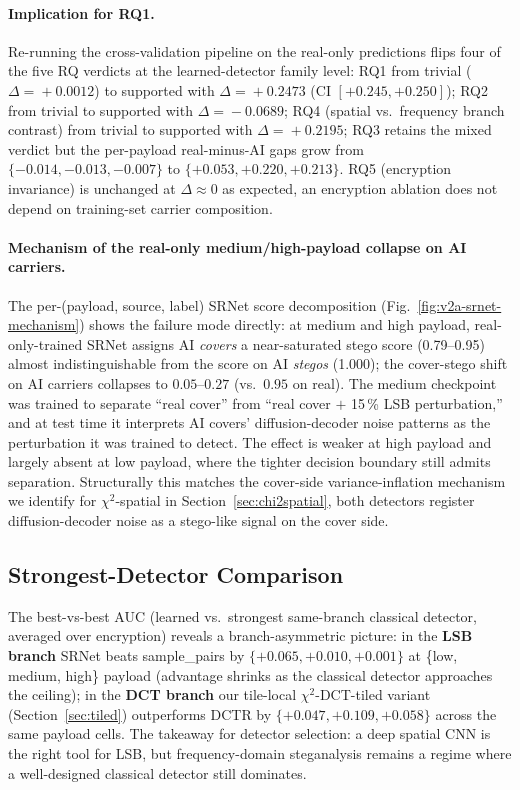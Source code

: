 \documentclass[10pt,twocolumn,a4paper]{article}
\begin{document}
\paragraph{Implication for RQ1.} Re-running the cross-validation pipeline on the real-only predictions flips four of the five RQ verdicts at the learned-detector family level: RQ1 from trivial ($\Delta\!=\!+0.0012$) to supported with $\Delta\!=\!+0.2473$ (CI $[+0.245,+0.250]$); RQ2 from trivial to supported with $\Delta\!=\!-0.0689$; RQ4 (spatial vs.\ frequency branch contrast) from trivial to supported with $\Delta\!=\!+0.2195$; RQ3 retains the mixed verdict but the per-payload real-minus-AI gaps grow from $\{-0.014, -0.013, -0.007\}$ to $\{+0.053, +0.220, +0.213\}$. RQ5 (encryption invariance) is unchanged at $\Delta\!\approx\!0$ as expected, an encryption ablation does not depend on training-set carrier composition.

\paragraph{Mechanism of the real-only medium/high-payload collapse on AI carriers.} The per-(payload, source, label) SRNet score decomposition (Fig.~\ref{fig:v2a-srnet-mechanism}) shows the failure mode directly: at medium and high payload, real-only-trained SRNet assigns AI \emph{covers} a near-saturated stego score (0.79--0.95) almost indistinguishable from the score on AI \emph{stegos} (1.000); the cover-stego shift on AI carriers collapses to $0.05$--$0.27$ (vs.\ $0.95$ on real). The medium checkpoint was trained to separate ``real cover'' from ``real cover $+$ 15\,\% LSB perturbation,'' and at test time it interprets AI covers' diffusion-decoder noise patterns as the perturbation it was trained to detect. The effect is weaker at high payload and largely absent at low payload, where the tighter decision boundary still admits separation. Structurally this matches the cover-side variance-inflation mechanism we identify for $\chi^2$-spatial in Section~\ref{sec:chi2spatial}, both detectors register diffusion-decoder noise as a stego-like signal on the cover side.

\subsection{Strongest-Detector Comparison}

The best-vs-best AUC (learned vs.\ strongest same-branch classical detector, averaged over encryption) reveals a branch-asymmetric picture: in the \textbf{LSB branch} SRNet beats sample\_pairs by $\{+0.065, +0.010, +0.001\}$ at \{low, medium, high\} payload (advantage shrinks as the classical detector approaches the ceiling); in the \textbf{DCT branch} our tile-local $\chi^2$-DCT-tiled variant (Section~\ref{sec:tiled}) outperforms DCTR by $\{+0.047, +0.109, +0.058\}$ across the same payload cells. The takeaway for detector selection: a deep spatial CNN is the right tool for LSB, but frequency-domain steganalysis remains a regime where a well-designed classical detector still dominates.
\end{document}
